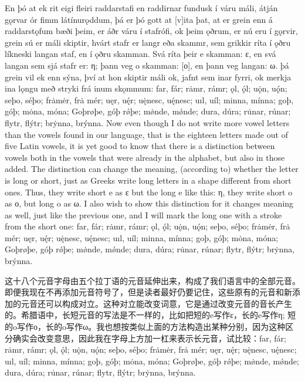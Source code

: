 \begin{paracol}{2}
    En þó at ek rit eigi fleiri raddarstafi en raddirnar fundusk í váru máli, átján gǫrvar ór fimm látínurǫddum, þá er þó gott at [v]ita þat, at er grein enn á raddarstǫfum bæði þeim, er áðr váru í stafrófi, ok þeim ǫðrum, er nú eru í gǫrvir, grein sú er máli skiptir, hvárt stafr er langr eða skammr, sem grikkir ríta í ǫðru líkneski langan staf, en í ǫðru skamman. Svá ríta þeir e skamman: ε, en svá langan sem sjá stafr er: η; þann veg o skamman: [ο], en þann veg langan: ω. þá grein vil ek enn sýna, því at hon skiptir máli ok, jafnt sem inar fyrri, ok merkja ina lǫngu með stryki frá inum skǫmmum: far, fár; rȧmr, rámr; ǫl, ǫ́l; uǫ̇n, uǫ́n; seþo, séþo; frȧmėr, frȧ mér; uęr, uę́r; uę̇nesc, uę́nesc; uıl, uíl; minna, mínna; goþ, góþ; mȯna, móna; Goþrøþe, góþ rǿþe; mø̇nde, mǿnde; dura, dúra; ru̇nar, rúnar; flytr, flýtr; brẏnna, brýnna.
    \switchcolumn
    Now even though I do not write more vowel letters than the vowels found in our language, that is the eighteen letters made out of five Latin vowels, it is yet good to know that there is a distinction between vowels both in the vowels that were already in the alphabet, but also in those added. The distinction can change the meaning, (according to) whether the letter is long or short, just as Greeks write long letters in a shape different from short ones. Thus, they write short e as ε but the long e like this: η, they write short o as ο, but long o as ω. I also wish to show this distinction for it changes meaning as well, just like the previous one, and I will mark the long one with a stroke from the short one: far, fár; rȧmr, rámr; ǫl, ǫ́l; uǫ̇n, uǫ́n; seþo, séþo; frȧmėr, frȧ mér; uęr, uę́r; uę̇nesc, uę́nesc; uıl, uíl; minna, mínna; goþ, góþ; mȯna, móna; Goþrøþe, góþ rǿþe; mø̇nde, mǿnde; dura, dúra; ru̇nar, rúnar; flytr, flýtr; brẏnna, brýnna.
\end{paracol}
\begin{translation*}{}
    这十八个元音字母由五个拉丁语的元音延伸出来，构成了我们语言中的全部元音。即便我现在不再添加元音符号了，但是读者最好仍要记住，这些原有的元音和新添加的元音还可以构成对立。这种对立能改变词意，它是通过改变元音的音长产生的。希腊语中，长短元音的写法是不一样的，比如把短的e写作ε，长的e写作η; 短的o写作ο，长的o写作ω。我也想按类似上面的方法构造出某种分别，因为这种区分确实会改变意思，因此我在字母上方加一杠来表示长元音，试比较：far, fár; rȧmr, rámr; ǫl, ǫ́l; uǫ̇n, uǫ́n; seþo, séþo; frȧmėr, frȧ mér; uęr, uę́r; uę̇nesc, uę́nesc; uıl, uíl; minna, mínna; goþ, góþ; mȯna, móna; Goþrøþe, góþ rǿþe; mø̇nde, mǿnde; dura, dúra; ru̇nar, rúnar; flytr, flýtr; brẏnna, brýnna.
\end{translation*}
